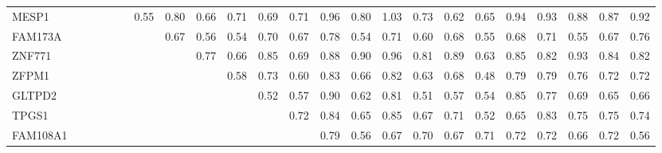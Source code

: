 \begin{longtable}{lrrrrrrrrrrrrrrrrrrrrrr}
MESP1         &            &             &            &               &             &          0.55 &         0.80 &        0.66 &         0.71 &        0.69 &           0.71 &                0.96 &        0.80 &          1.03 &         0.73 &         0.62 &         0.65 &       0.94 &         0.93 &           0.88 &         0.87 &         0.92 \\
FAM173A       &            &             &            &               &             &               &         0.67 &        0.56 &         0.54 &        0.70 &           0.67 &                0.78 &        0.54 &          0.71 &         0.60 &         0.68 &         0.55 &       0.68 &         0.71 &           0.55 &         0.67 &         0.76 \\
ZNF771        &            &             &            &               &             &               &              &        0.77 &         0.66 &        0.85 &           0.69 &                0.88 &        0.90 &          0.96 &         0.81 &         0.89 &         0.63 &       0.85 &         0.82 &           0.93 &         0.84 &         0.82 \\
ZFPM1         &            &             &            &               &             &               &              &             &         0.58 &        0.73 &           0.60 &                0.83 &        0.66 &          0.82 &         0.63 &         0.68 &         0.48 &       0.79 &         0.79 &           0.76 &         0.72 &         0.72 \\
GLTPD2        &            &             &            &               &             &               &              &             &              &        0.52 &           0.57 &                0.90 &        0.62 &          0.81 &         0.51 &         0.57 &         0.54 &       0.85 &         0.77 &           0.69 &         0.65 &         0.66 \\
TPGS1         &            &             &            &               &             &               &              &             &              &             &           0.72 &                0.84 &        0.65 &          0.85 &         0.67 &         0.71 &         0.52 &       0.65 &         0.83 &           0.75 &         0.75 &         0.74 \\
FAM108A1      &            &             &            &               &             &               &              &             &              &             &                &                0.79 &        0.56 &          0.67 &         0.70 &         0.67 &         0.71 &       0.72 &         0.72 &           0.66 &         0.72 &         0.56 \\

\end{longtable}
